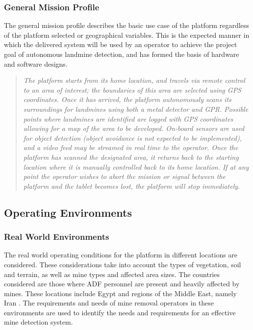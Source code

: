 \documentclass[main.tex]{subfiles}
\begin{document}
\subsubsection{General Mission Profile}
The general mission profile describes the basic use case of the platform regardless of the platform selected or geographical variables. This is the expected manner in which the delivered system will be used by an operator to achieve the project goal of autonomous landmine detection, and has formed the basis of hardware and software designs.
\begin{quote}\textit{The platform starts from its home location, and travels via remote control to an area of interest; the boundaries of this area are selected using GPS coordinates. Once it has arrived, the platform autonomously scans its surroundings for landmines using both a metal detector and GPR. Possible points where landmines are identified are logged with GPS coordinates allowing for a map of the area to be developed. On-board sensors are used for object detection (object avoidance is not expected to be implemented), and a video feed may be streamed in real time to the operator. Once the platform has scanned the designated area, it returns back to the starting location where it is manually controlled back to its home location. If at any point the operator wishes to abort the mission or signal between the platform and the tablet becomes lost, the platform will stop immediately.}
\end{quote}
\subsection{Operating Environments}
\subsubsection{Real World Environments}
The real world operating conditions for the platform in different locations are considered. These considerations take into account the types of vegetation, soil and terrain, as well as mine types and affected area sizes. The countries considered are those where ADF personnel are present and heavily affected by mines. These locations include Egypt and regions of the Middle East, namely Iran \parencite{AustralianGovernment2016}. The requirements and needs of mine removal operators in these environments are used to identify the needs and requirements for an effective mine detection system.
\end{document}
